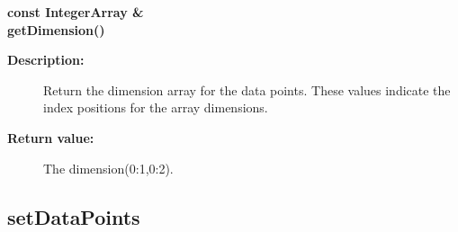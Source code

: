 \begin{flushleft} \textbf{%
const IntegerArray \&  \\ 
\settowidth{\DataPointMappingIncludeArgIndent}{getDimension(}%
getDimension()
}\end{flushleft}
\begin{description}
\item[{\bf Description:}] 
  Return the dimension array for the data points. These values indicate
  the index positions for the array dimensions.
\item[{\bf Return value:}]  The dimension(0:1,0:2).
\end{description}
\subsection{setDataPoints}
 
